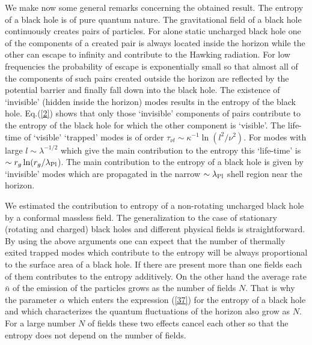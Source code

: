 \documentclass[superscriptaddress,showpacs,preprintnumbers,amsmath,amssymb,
nofootinbib,aps,prd,12pt]{revtex4-1}
\begin{document}
We make now some general remarks concerning the obtained result.   The
entropy  of   a  black   hole   is   of  pure   quantum  nature.   The
gravitational  field  of  a  black  hole continuously creates pairs of
particles. For alone static uncharged black hole one of the components
of a created pair is always located inside the horizon while the other
can escape  to  infinity  and  contribute  to  the  Hawking radiation.
For low frequencies the probability of escape is exponentially small so
that almost all of the components of such pairs created outside  the
horizon are reflected by  the potential barrier  and finally   fall
down  into the  black hole.  The existence of `invisible'  (hidden
inside the  horizon) modes results  in the  entropy  of  the  black
hole.  Eq.(\ref{2})  shows  that  only   those `invisible' components of
pairs contribute to the entropy of the black hole for  which the  other
component  is `visible'.  The life-time  of `visible' `trapped' modes
is of   order $\tau_{\nu l}\sim \kappa  ^{-1}\ln (l^2  /\nu ^2 )$. For
modes with  large $l\sim   \lambda  ^{-1/2}$ which give   the  main
contribution to the entropy    this `life-time' is  $\sim r_g  \ln (r_g
/\lambda  _{\mbox{\scriptsize{Pl}}}$). The  main   contribution to
the entropy of a black
hole is given by  `invisible' modes which are propagated in  the narrow
$\sim  \lambda _{\mbox{\scriptsize{Pl}}}$ shell region  near the horizon.

We estimated the contribution  to entropy of a  non-rotating uncharged
black hole by  a conformal massless  field. The generalization  to the
case  of  stationary (rotating and charged) black   holes  and
different physical fields  is straightforward. By using the above
arguments one can expect that  the number  of thermally exited trapped
modes  which  contribute  to  the entropy will be always proportional
to the surface area of a black hole.  If there are present more than one
fields each of them contributes to the entropy  additively.  On the other
hand  the average rate $\bar{n}$  of the emission of  the particles
grows as  the number  of fields $N$. That is why the parameter $\alpha$
which enters the expression (\ref{37}) for the entropy of a black hole
and which characterizes the quantum
fluctuations of the horizon also grow as $N$.  For a large number $N$
of fields these two  effects cancel each  other so that  the entropy
does not depend on the number of fields.
\end{document}
